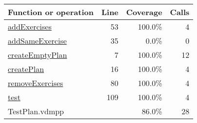\begin{longtable}{|l|r|r|r|}
\hline
Function or operation & Line & Coverage & Calls \\
\hline
\hline
\hyperref[addExercises:53]{addExercises} & 53&100.0\% & 4 \\
\hline
\hyperref[addSameExercise:35]{addSameExercise} & 35&0.0\% & 0 \\
\hline
\hyperref[createEmptyPlan:7]{createEmptyPlan} & 7&100.0\% & 12 \\
\hline
\hyperref[createPlan:16]{createPlan} & 16&100.0\% & 4 \\
\hline
\hyperref[removeExercises:80]{removeExercises} & 80&100.0\% & 4 \\
\hline
\hyperref[test:109]{test} & 109&100.0\% & 4 \\
\hline
\hline
TestPlan.vdmpp & & 86.0\% & 28 \\
\hline
\end{longtable}

